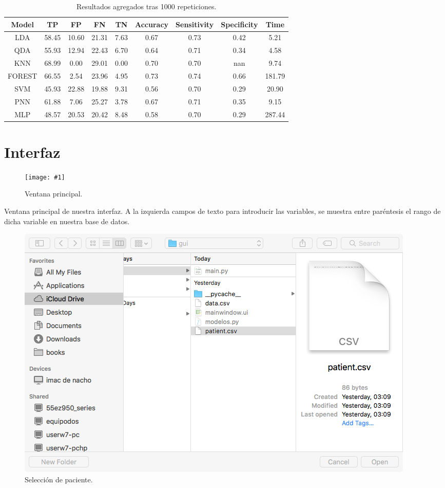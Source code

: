 \documentclass{article}
\newcommand{\incpng}[2]{
\begin{figure}[h]
\centering
\texttt{[image: \#1]}
\caption{#2}
\end{figure}
}
\begin{document}
\begin{table}[h!]
\centering
\begin{tabular}{|c|c|c|c|c|c|c|c|c|}
\hline
Model  & TP    & FP    & FN    & TN   & Accuracy & Sensitivity & Specificity & Time\\
\hline
   LDA & 58.45 & 10.60 & 21.31 & 7.63 &  0.67    & 0.73        & 0.42        & 5.21\\
   QDA & 55.93 & 12.94 & 22.43 & 6.70 &  0.64    & 0.71        & 0.34        & 4.58\\
   KNN & 68.99 & 0.00  & 29.01 & 0.00 &  0.70    & 0.70        & nan         & 9.74\\
FOREST & 66.55 & 2.54  & 23.96 & 4.95 &  0.73    & 0.74        & 0.66        & 181.79\\
   SVM & 45.93 & 22.88 & 19.88 & 9.31 &  0.56    & 0.70        & 0.29        & 20.90\\
   PNN & 61.88 & 7.06  & 25.27 & 3.78 &  0.67    & 0.71        & 0.35        & 9.15\\
   MLP & 48.57 & 20.53 & 20.42 & 8.48 &  0.58    & 0.70        & 0.29        & 287.44\\
\hline
\end{tabular}
\caption{Resultados agregados tras 1000 repeticiones.}
\label{table:}
\end{table}

\section{Interfaz}

\incpng{../images/s1.png} {Ventana principal.}

Ventana principal de nuestra interfaz. A la izquierda campos de texto
para introducir las variables, se muestra entre paréntesis el rango de
dicha variable en nuestra base de datos.

\begin{figure}[h]
\centering
\includegraphics[trim=3cm 1cm 3cm 0cm, width = 0.5\linewidth]{../images/s2.png}
\caption{Selección de paciente.}
\end{figure}
\end{document}
